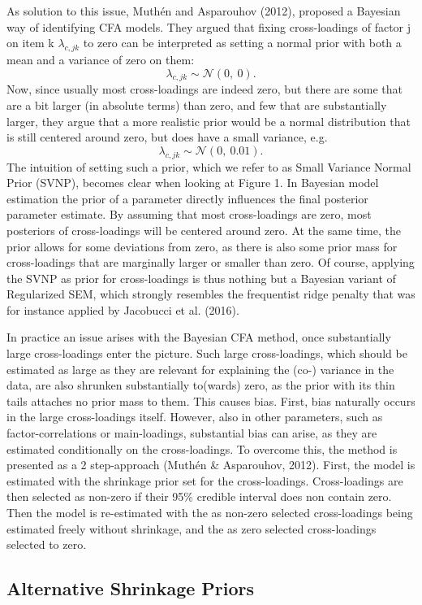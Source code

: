 \documentclass[
  man, donotrepeattitle,floatsintext]{apa6}
\begin{document}
As solution to this issue, Muthén and Asparouhov (2012), proposed a Bayesian way of identifying CFA models. They argued that fixing cross-loadings of factor j on item k \(\lambda_{c,jk}\) to zero can be interpreted as setting a normal prior with both a mean and a variance of zero on them:
\[\lambda_{c,jk}  \sim \mathcal{N}(0, \ 0).\]
Now, since usually most cross-loadings are indeed zero, but there are some that are a bit larger (in absolute terms) than zero, and few that are substantially larger, they argue that a more realistic prior would be a normal distribution that is still centered around zero, but does have a small variance, e.g.~
\[\lambda_{c,jk}  \sim \mathcal{N}(0, \ 0.01).\]
The intuition of setting such a prior, which we refer to as Small Variance Normal Prior (SVNP), becomes clear when looking at Figure 1. In Bayesian model estimation the prior of a parameter directly influences the final posterior parameter estimate. By assuming that most cross-loadings are zero, most posteriors of cross-loadings will be centered around zero. At the same time, the prior allows for some deviations from zero, as there is also some prior mass for cross-loadings that are marginally larger or smaller than zero. Of course, applying the SVNP as prior for cross-loadings is thus nothing but a Bayesian variant of Regularized SEM, which strongly resembles the frequentist ridge penalty that was for instance applied by Jacobucci et al. (2016).

In practice an issue arises with the Bayesian CFA method, once substantially large cross-loadings enter the picture. Such large cross-loadings, which should be estimated as large as they are relevant for explaining the (co-) variance in the data, are also shrunken substantially to(wards) zero, as the prior with its thin tails attaches no prior mass to them. This causes bias. First, bias naturally occurs in the large cross-loadings itself. However, also in other parameters, such as factor-correlations or main-loadings, substantial bias can arise, as they are estimated conditionally on the cross-loadings. To overcome this, the method is presented as a 2 step-approach (Muthén \& Asparouhov, 2012). First, the model is estimated with the shrinkage prior set for the cross-loadings. Cross-loadings are then selected as non-zero if their 95\% credible interval does non contain zero. Then the model is re-estimated with the as non-zero selected cross-loadings being estimated freely without shrinkage, and the as zero selected cross-loadings selected to zero.

\hypertarget{alternative-shrinkage-priors}{%
\subsection{Alternative Shrinkage Priors}\label{alternative-shrinkage-priors}}
\end{document}
